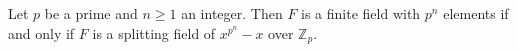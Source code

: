 Let $p$ be a prime and $n \geq 1$ an integer. Then $F$ is a finite field with $p^n$ elements if and only if $F$ is a splitting field of $x^{p^n} - x$ over $\mathbb{Z}_p$.
